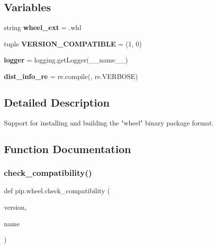 \subsection*{Variables}
\begin{DoxyCompactItemize}
\item 
\mbox{\label{namespacepip_1_1wheel_afda302095a55044a3451b41a2318f4fc}} 
string {\bfseries wheel\+\_\+ext} = \textquotesingle{}.whl\textquotesingle{}
\item 
\mbox{\label{namespacepip_1_1wheel_ae2a371a19c9cf3d2f943391c6bc2fae0}} 
tuple {\bfseries V\+E\+R\+S\+I\+O\+N\+\_\+\+C\+O\+M\+P\+A\+T\+I\+B\+LE} = (1, 0)
\item 
\mbox{\label{namespacepip_1_1wheel_a3f5d6e3cde1fa3fd718949a4f99c3ef5}} 
{\bfseries logger} = logging.\+get\+Logger(\+\_\+\+\_\+name\+\_\+\+\_\+)
\item 
\mbox{\label{namespacepip_1_1wheel_a391ca1aa2ed1e22282d7353aea34645b}} 
{\bfseries dist\+\_\+info\+\_\+re} = re.\+compile(, re.\+V\+E\+R\+B\+O\+SE)
\end{DoxyCompactItemize}


\subsection{Detailed Description}
\begin{DoxyVerb}Support for installing and building the "wheel" binary package format.
\end{DoxyVerb}
 

\subsection{Function Documentation}
\mbox{\label{namespacepip_1_1wheel_a4f43de549d71ed87fd2c9e19756bc3cd}} 
\subsubsection{\texorpdfstring{check\+\_\+compatibility()}{check\_compatibility()}}
{\footnotesize\ttfamily def pip.\+wheel.\+check\+\_\+compatibility (\begin{DoxyParamCaption}\item[{}]{version,  }\item[{}]{name }\end{DoxyParamCaption})}

